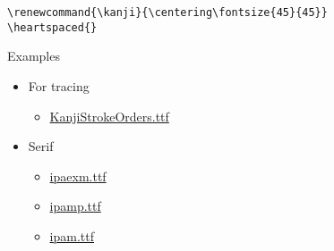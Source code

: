 \documentclass[letterpaper]{article}
\begin{document}
	\textcolor{gray}{}
	\vspace*{2cm}
	
	\begin{multicols}{4}
		
		\renewcommand{\kanji}{\centering\fontsize{45}{45}}
		\RLmulticolcolumns
		
\end{multicols}

\begin{verbatim}
\renewcommand{\kanji}{\centering\fontsize{45}{45}}
\heartspaced{}
\end{verbatim}


\vfill\eject\pagebreak

\vspace*{3cm}


{\LARGE Examples}

\vspace*{1cm}



\begin{itemize}
	\item[] {\LARGE For tracing}
	\begin{itemize}
	\item[] \href{https://github.com/gwmatthews/TheFourVows/blob/main/the-four-vows.pdf}{KanjiStrokeOrders.ttf}
\end{itemize}
\end{itemize}

\vspace*{1cm}

\begin{itemize}
	\item[] {\LARGE Serif}
	\begin{itemize}
	\item[] \href{https://github.com/gwmatthews/TheFourVows/blob/main/the-four-vows-ipaexm.pdf}{ipaexm.ttf}
	\item[] \href{https://github.com/gwmatthews/TheFourVows/blob/main/the-four-vows-ipamp.pdf}{ipamp.ttf}
	\item[] 
	\href{https://github.com/gwmatthews/TheFourVows/blob/main/the-four-vows-ipam.pdf}{ipam.ttf}
\end{itemize}
\end{itemize}
\end{document}
